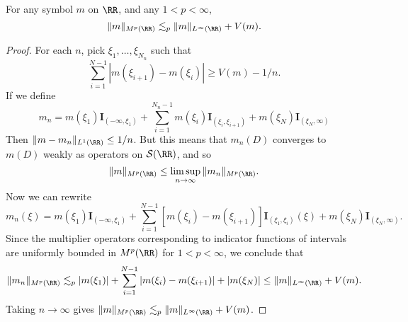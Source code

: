 \begin{theorem}
  For any symbol $m$ on $\RR$, and any $1 < p < \infty$,
  \[ \| m \|_{M^p(\RR)} \lesssim_p \| m \|_{L^\infty(\RR)} + V(m). \]
\end{theorem}
\begin{proof}
  For each $n$, pick $\xi_1,\dots,\xi_{N_n}$ such that
  \[ \sum_{i = 1}^{N-1} |m(\xi_{i+1}) - m(\xi_i)| \geq V(m) - 1/n. \]
  If we define
  \[ m_n = m(\xi_1) \mathbf{I}_{(-\infty,\xi_1)} + \sum_{i = 1}^{N_n-1} m(\xi_i) \mathbf{I}_{(\xi_i,\xi_{i+1})} + m(\xi_N) \mathbf{I}_{(\xi_N,\infty)} \]
  Then $\| m - m_n \|_{L^1(\RR)} \leq 1/n$. But this means that $m_n(D)$ converges to $m(D)$ weakly as operators on $\mathcal{S}(\RR)$, and so
  \[ \| m \|_{M^p(\RR)} \leq \limsup_{n \to \infty} \| m_n \|_{M^p(\RR)}. \]
  Now we can rewrite
  \[ m_n(\xi) = m(\xi_1) \mathbf{I}_{(-\infty,\xi_1)} + \sum_{i = 1}^{N-1} [m(\xi_i) - m(\xi_{i+1})] \mathbf{I}_{(\xi_1,\xi_i)}(\xi) + m(\xi_N) \mathbf{I}_{(\xi_N,\infty)}. \]
  Since the multiplier operators corresponding to indicator functions of intervals are uniformly bounded in $M^p(\RR)$ for $1 < p < \infty$, we conclude that
  \[ \| m_n \|_{M^p(\RR)} \lesssim_p |m(\xi_1)| + \sum_{i = 1}^{N-1} |m(\xi_i) - m(\xi_{i+1})| + |m(\xi_N)| \leq \| m \|_{L^\infty(\RR)} + V(m). \]
  Taking $n \to \infty$ gives $\| m \|_{M^p(\RR)} \lesssim_p \| m \|_{L^\infty(\RR)} + V(m)$.
\end{proof}

